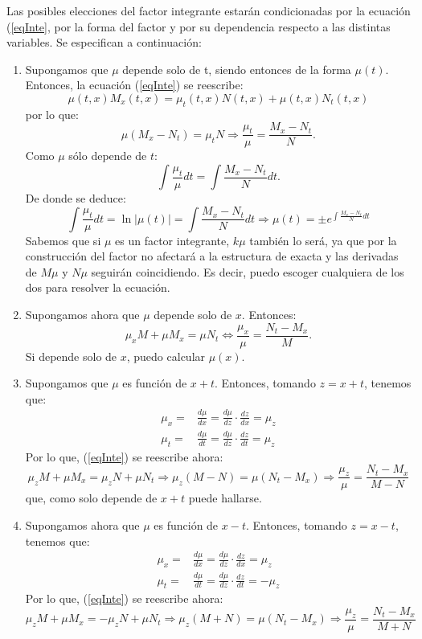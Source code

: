 \documentclass[11pt]{article}
\theoremstyle{theorem-style}  %
\theoremstyle{definition-style}
\theoremstyle{example-style}
\providecommand{\abs}[1]{\left\lvert#1\right\rvert} %
\begin{document}
Las posibles elecciones del factor integrante estarán condicionadas por la ecuación (\ref{eqInte}, por la forma del factor y por su dependencia respecto a las distintas variables. Se especifican a continuación:
\begin{enumerate}
	\item Supongamos que $\mu$ depende solo de t, siendo entonces de la forma $\mu(t)$. Entonces, la ecuación (\ref{eqInte}) se reescribe:
	\[\mu(t, x)M_x(t, x) = \mu_t(t, x)N(t, x) + \mu(t, x)N_t(t, x)\]
	por lo que:
	\[\mu\left( M_x-N_t\right) = \mu_t N \Rightarrow \frac{\mu_t}{\mu} = \frac{M_x - N_t}{N}.\]
	Como $ \mu $ sólo depende de $t$:
	\[\int \frac{\mu_t}{\mu}dt = \int \frac{M_x - N_t}{N}dt.\]
	De donde se deduce:
	\[ \int \frac{\mu_t}{\mu}dt = \ln\abs{\mu(t)}= \int \frac{M_x - N_t}{N}dt\Rightarrow \mu(t)=\pm e^{\int \frac{M_x - N_t}{N}dt}\]
	Sabemos que si $ \mu $ es un factor integrante, $ k\mu $ también lo será, ya que por la construcción del factor no afectará a la estructura de exacta y las derivadas de $ M\mu $ y $ N\mu $ seguirán coincidiendo. Es decir, puedo escoger cualquiera de los dos para resolver la ecuación.
	\item Supongamos ahora que $\mu$ depende solo de $x$. Entonces:
	\[\mu_xM + \mu M_x = \mu N_t \Leftrightarrow \frac{\mu_x}{\mu} = \frac{N_t - M_x}{M}.\]
	Si depende solo de $x$, puedo calcular $\mu (x)$.
	\item  Supongamos que $\mu$ es función de $x+t$. Entonces, tomando $z=x+t$, tenemos que:
	\begin{align*}
		\mu_x = & \frac{d\mu}{dx} = \frac{d\mu}{dz} \cdot \frac{dz}{dx} = \mu_z \\
		\mu_t = & \frac{d\mu}{dt} = \frac{d\mu}{dz} \cdot \frac{dz}{dt} = \mu_z 
	\end{align*}
	Por lo que, (\ref{eqInte}) se reescribe ahora:
	\[\mu_z M + \mu M_x = \mu_z N + \mu N_t \Rightarrow \mu_z (M-N) = \mu (N_t - M_x) \Rightarrow \frac{\mu_z}{\mu} = \frac{N_t - M_x}{M - N}\]
	que, como solo depende de $x+t$ puede hallarse.
	\item Supongamos ahora que $\mu$ es función de $x-t$. Entonces, tomando $z=x-t$, tenemos que:
	\begin{align*}
	\mu_x = & \frac{d\mu}{dx} = \frac{d\mu}{dz} \cdot \frac{dz}{dx} = \mu_z \\
	\mu_t = & \frac{d\mu}{dt} = \frac{d\mu}{dz} \cdot \frac{dz}{dt} = -\mu_z 
	\end{align*}
	Por lo que, (\ref{eqInte}) se reescribe ahora:
	\[\mu_z M + \mu M_x = -\mu_z N + \mu N_t \Rightarrow \mu_z (M+N) = \mu (N_t - M_x) \Rightarrow \frac{\mu_z}{\mu} = \frac{N_t - M_x}{M + N}\]

\end{enumerate}
\end{document}
